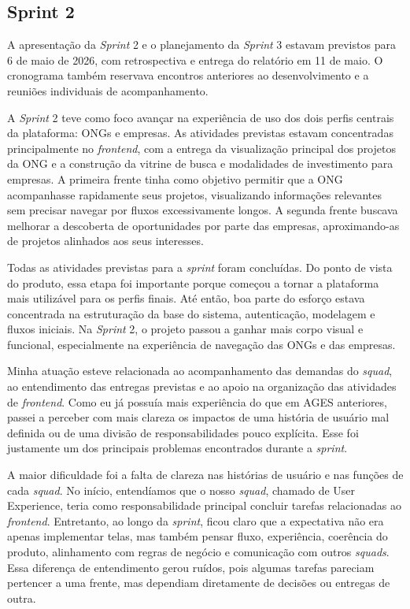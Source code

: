 \clearpage
\subsection{Sprint 2}

A apresentação da \textit{Sprint} 2 e o planejamento da \textit{Sprint} 3 estavam previstos para 6 de maio de 2026, com retrospectiva e entrega do relatório em 11 de maio. O cronograma também reservava encontros anteriores ao desenvolvimento e a reuniões individuais de acompanhamento.

A \textit{Sprint} 2 teve como foco avançar na experiência de uso dos dois perfis centrais da plataforma: \ac{ONGs} e empresas. As atividades previstas estavam concentradas principalmente no \textit{frontend}, com a entrega da visualização principal dos projetos da \ac{ONG} e a construção da vitrine de busca e modalidades de investimento para empresas. A primeira frente tinha como objetivo permitir que a \ac{ONG} acompanhasse rapidamente seus projetos, visualizando informações relevantes sem precisar navegar por fluxos excessivamente longos. A segunda frente buscava melhorar a descoberta de oportunidades por parte das empresas, aproximando-as de projetos alinhados aos seus interesses.

Todas as atividades previstas para a \textit{sprint} foram concluídas. Do ponto de vista do produto, essa etapa foi importante porque começou a tornar a plataforma mais utilizável para os perfis finais. Até então, boa parte do esforço estava concentrada na estruturação da base do sistema, autenticação, modelagem e fluxos iniciais. Na \textit{Sprint} 2, o projeto passou a ganhar mais corpo visual e funcional, especialmente na experiência de navegação das \ac{ONGs} e das empresas.

Minha atuação esteve relacionada ao acompanhamento das demandas do \textit{squad}, ao entendimento das entregas previstas e ao apoio na organização das atividades de \textit{frontend}. Como eu já possuía mais experiência do que em \ac{AGES} anteriores, passei a perceber com mais clareza os impactos de uma história de usuário mal definida ou de uma divisão de responsabilidades pouco explícita. Esse foi justamente um dos principais problemas encontrados durante a \textit{sprint}.

A maior dificuldade foi a falta de clareza nas histórias de usuário e nas funções de cada \textit{squad}. No início, entendíamos que o nosso \textit{squad}, chamado de User Experience, teria como responsabilidade principal concluir tarefas relacionadas ao \textit{frontend}. Entretanto, ao longo da \textit{sprint}, ficou claro que a expectativa não era apenas implementar telas, mas também pensar fluxo, experiência, coerência do produto, alinhamento com regras de negócio e comunicação com outros \textit{squads}. Essa diferença de entendimento gerou ruídos, pois algumas tarefas pareciam pertencer a uma frente, mas dependiam diretamente de decisões ou entregas de outra.

